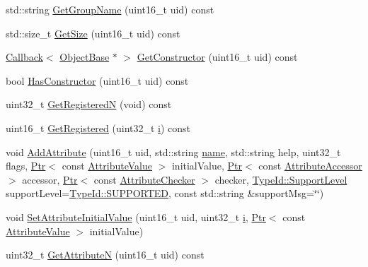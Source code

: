 \begin{DoxyCompactItemize}
std\+::string \hyperlink{classns3_1_1IidManager_ae349642e61a71123f6843961c1d57492}{Get\+Group\+Name} (uint16\+\_\+t uid) const 
\item 
std\+::size\+\_\+t \hyperlink{classns3_1_1IidManager_aa930cae3155ce5a29f32f1a601f54092}{Get\+Size} (uint16\+\_\+t uid) const 
\item 
\hyperlink{classns3_1_1Callback}{Callback}$<$ \hyperlink{classns3_1_1ObjectBase}{Object\+Base} $\ast$ $>$ \hyperlink{classns3_1_1IidManager_ab10b30abe7efc5456b7930aab8638280}{Get\+Constructor} (uint16\+\_\+t uid) const 
\item 
bool \hyperlink{classns3_1_1IidManager_a759cf8eee2b979be469d204c66b97980}{Has\+Constructor} (uint16\+\_\+t uid) const 
\item 
uint32\+\_\+t \hyperlink{classns3_1_1IidManager_af5213c5a53e5325b4d5880ed5af709a8}{Get\+RegisteredN} (void) const 
\item 
uint16\+\_\+t \hyperlink{classns3_1_1IidManager_a5396bb677bdbeba99ff3ce2b572fc00f}{Get\+Registered} (uint32\+\_\+t \hyperlink{lte__uplink__power__control_8m_a6f6ccfcf58b31cb6412107d9d5281426}{i}) const 
\item 
void \hyperlink{classns3_1_1IidManager_adc2f2efdd19361885c09082cca33454f}{Add\+Attribute} (uint16\+\_\+t uid, std\+::string \hyperlink{generate__test__data__lte__spectrum__model_8m_ab74e6bf80237ddc4109968cedc58c151}{name}, std\+::string help, uint32\+\_\+t flags, \hyperlink{classns3_1_1Ptr}{Ptr}$<$ const \hyperlink{classns3_1_1AttributeValue}{Attribute\+Value} $>$ initial\+Value, \hyperlink{classns3_1_1Ptr}{Ptr}$<$ const \hyperlink{classns3_1_1AttributeAccessor}{Attribute\+Accessor} $>$ accessor, \hyperlink{classns3_1_1Ptr}{Ptr}$<$ const \hyperlink{classns3_1_1AttributeChecker}{Attribute\+Checker} $>$ checker, \hyperlink{classns3_1_1TypeId_ad55d31e57490a83a3ededa096a8d2588}{Type\+Id\+::\+Support\+Level} support\+Level=\hyperlink{classns3_1_1TypeId_ad55d31e57490a83a3ededa096a8d2588a3eb3cddc13c7c70f1ab58e15babdda11}{Type\+Id\+::\+S\+U\+P\+P\+O\+R\+T\+ED}, const std\+::string \&support\+Msg=\char`\"{}\char`\"{})
\item 
void \hyperlink{classns3_1_1IidManager_a457bf1ceda4093531984fec8439273ee}{Set\+Attribute\+Initial\+Value} (uint16\+\_\+t uid, uint32\+\_\+t \hyperlink{lte__uplink__power__control_8m_a6f6ccfcf58b31cb6412107d9d5281426}{i}, \hyperlink{classns3_1_1Ptr}{Ptr}$<$ const \hyperlink{classns3_1_1AttributeValue}{Attribute\+Value} $>$ initial\+Value)
\item 
uint32\+\_\+t \hyperlink{classns3_1_1IidManager_aecf79ed6edb63647774dbfe90cc4f1e2}{Get\+AttributeN} (uint16\+\_\+t uid) const 

\end{DoxyCompactItemize}
